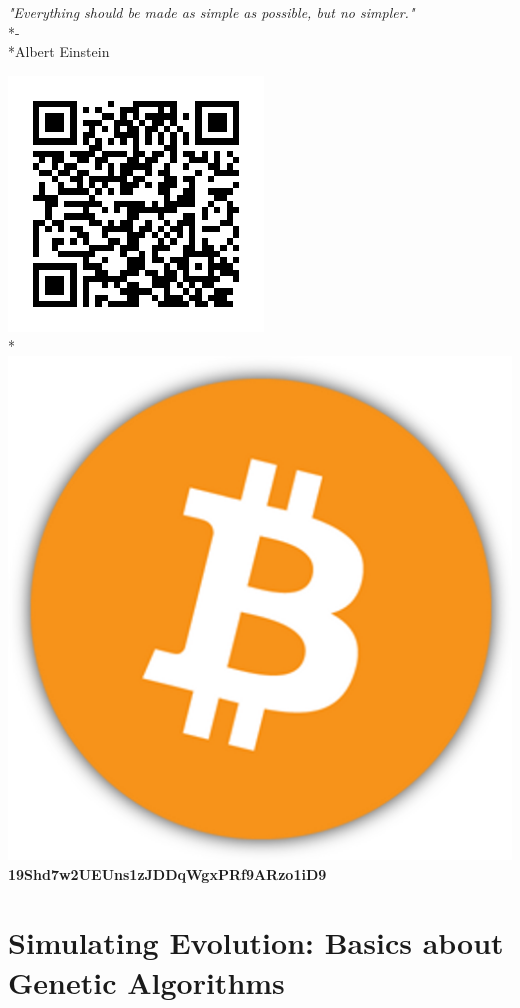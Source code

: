 \documentclass[12pt]{book}
\begin{document}
\begin{center}
\textit{"Everything should be made as simple as possible, but no simpler."}\\*-\\*Albert Einstein
\end{center}
\begin{center}
\includegraphics[scale=0.5]{BitcoinAddress.png}\\*
\includegraphics[scale=0.02]{Bitcoin.png} \textbf{19Shd7w2UEUns1zJDDqWgxPRf9ARzo1iD9}
\end{center}
\clearpage
\chapter{Simulating Evolution: Basics about Genetic Algorithms}
\end{document}
